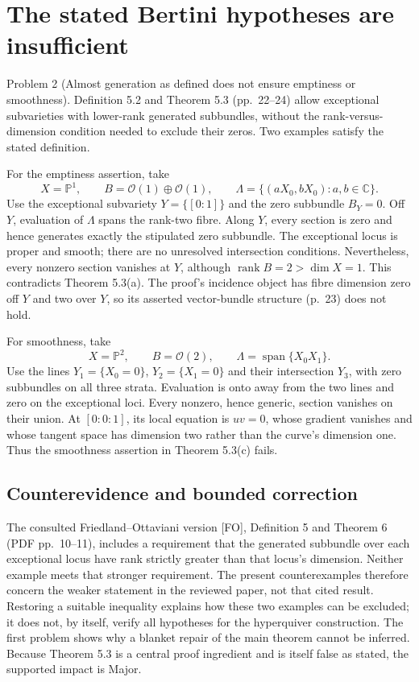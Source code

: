 \documentclass[10pt]{article}
\begin{document}
\section*{The stated Bertini hypotheses are insufficient}
Problem 2 (Almost generation as defined does not ensure emptiness or smoothness).  Definition 5.2 and Theorem 5.3 (pp. 22–24) allow exceptional subvarieties with lower-rank generated subbundles, without the rank-versus-dimension condition needed to exclude their zeros. Two examples satisfy the stated definition.\par
For the emptiness assertion, take \[X=\mathbb P^1,\qquad B=\mathcal O(1)\oplus\mathcal O(1),\qquad
\Lambda=\{(aX_0,bX_0):a,b\in\mathbb C\}.\] Use the exceptional subvariety \(Y=\{[0:1]\}\) and the zero subbundle \(B_Y=0\). Off \(Y\), evaluation of \(\Lambda\) spans the rank-two fibre. Along \(Y\), every section is zero and hence generates exactly the stipulated zero subbundle. The exceptional locus is proper and smooth; there are no unresolved intersection conditions. Nevertheless, every nonzero section vanishes at \(Y\), although \(\operatorname{rank}B=2>\dim X=1\). This contradicts Theorem 5.3(a). The proof’s incidence object has fibre dimension zero off \(Y\) and two over \(Y\), so its asserted vector-bundle structure (p. 23) does not hold.\par
For smoothness, take \[X=\mathbb P^2,\qquad B=\mathcal O(2),\qquad
\Lambda=\operatorname{span}\{X_0X_1\}.\] Use the lines \(Y_1=\{X_0=0\}\), \(Y_2=\{X_1=0\}\) and their intersection \(Y_3\), with zero subbundles on all three strata. Evaluation is onto away from the two lines and zero on the exceptional loci. Every nonzero, hence generic, section vanishes on their union. At \([0:0:1]\), its local equation is \(uv=0\), whose gradient vanishes and whose tangent space has dimension two rather than the curve’s dimension one. Thus the smoothness assertion in Theorem 5.3(c) fails.\par
\subsection*{Counterevidence and bounded correction}
The consulted Friedland–Ottaviani version [FO], Definition 5 and Theorem 6 (PDF pp. 10–11), includes a requirement that the generated subbundle over each exceptional locus have rank strictly greater than that locus’s dimension. Neither example meets that stronger requirement. The present counterexamples therefore concern the weaker statement in the reviewed paper, not that cited result. Restoring a suitable inequality explains how these two examples can be excluded; it does not, by itself, verify all hypotheses for the hyperquiver construction. The first problem shows why a blanket repair of the main theorem cannot be inferred. Because Theorem 5.3 is a central proof ingredient and is itself false as stated, the supported impact is Major.\par
\end{document}
